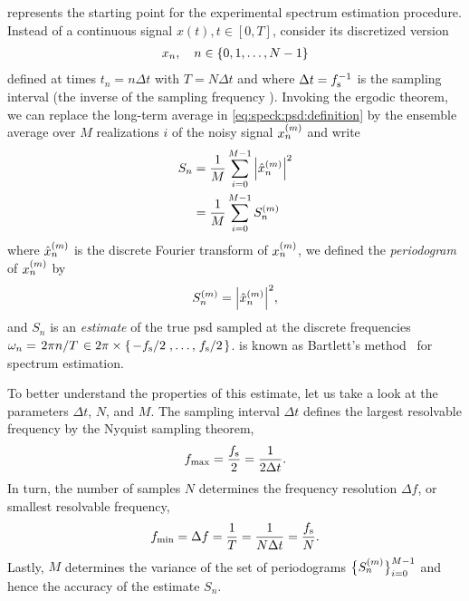  represents the starting point for the experimental spectrum estimation procedure.
Instead of a continuous signal $x(t), t\in [0, T]$, consider its discretized version
\begin{align}\label{eq:speck:signal:discrete}
    x_n \qc n\in\lbrace 0, 1, \dotsc, N - 1\rbrace
\end{align}
defined at times $t_n = n\Delta t$ with $T = N\Delta t$ and where $\Delta t = f_{\mathrm{s}}^{-1}$ is the sampling interval (the inverse of the sampling frequency \fs).
Invoking the ergodic theorem, we can replace the long-term average in \cref{eq:speck:psd:definition} by the ensemble average over $M$ realizations $i$ of the noisy signal $x_n^{(m)}$ and write
\begin{align}\label{eq:speck:psd:bartlett}
    S_n &= \frac{1}{M} \sum_{i=0}^{M-1} \abs{\hat{x}_n^{(m)}}^2 \\
        &= \frac{1}{M} \sum_{i=0}^{M-1} S_n^{(m)}
\end{align}
where $\hat{x}_n^{(m)}$ is the discrete Fourier transform of $x_n^{(m)}$, we defined the \emph{periodogram} of $x_n^{(m)}$ by
\begin{align}\label{eq:speck:periodogram}
    S_n^{(m)} = \abs{\hat{x}_n^{(m)}}^2,
\end{align}
and $S_n$ is an \emph{estimate} of the true \gls{psd} sampled at the discrete frequencies $\omega_n = \flatfrac{2\pi n}{T} \in 2\pi\times\lbrace\flatfrac{-\fs}{2}, \dotsc, \flatfrac{\fs}{2}\rbrace$.
 is known as Bartlett's method~\cite{Bartlett1948} for spectrum estimation.

To better understand the properties of this estimate, let us take a look at the parameters $\Delta t$, $N$, and $M$.
The sampling interval $\Delta t$ defines the largest resolvable frequency by the Nyquist sampling theorem,
\begin{align}\label{eq:speck:f_max}
    f_{\mathrm{max}} = \frac{f_{\mathrm{s}}}{2} = \frac{1}{2\Delta t}.
\end{align}
In turn, the number of samples $N$ determines the frequency resolution $\Delta f$, or smallest resolvable frequency,
\begin{align}\label{eq:speck:f_min}
    f_{\mathrm{min}} = \Delta f = \frac{1}{T} = \frac{1}{N\Delta t} = \frac{f_{\mathrm{s}}}{N}.
\end{align}
Lastly, $M$ determines the variance of the set of periodograms $\bigl\lbrace S_n^{(m)}\bigr\rbrace_{i=0}^{M-1}$ and hence the accuracy of the estimate $S_n$.

